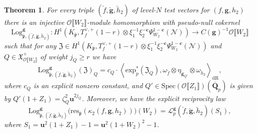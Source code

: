 \documentclass[10pt,letterpaper]{amsart}
\theoremstyle{plain}
\newtheorem{thm}{Theorem}[subsection] %
\theoremstyle{definition}
\theoremstyle{definition}
\theoremstyle{plain}
\theoremstyle{plain}
\theoremstyle{plain}
\theoremstyle{remark}
\numberwithin{equation}{section}
\newcommand{\cc}{\mathbf{c}}
\newcommand{\ch}{\xi}
\newcommand{\rH}{H}
\newcommand{\ppbar}{\bar{\mathfrak{p}}}
\def\cO{\mathcal O}
\newcommand{\Q}{\mathbf{Q}}
\newcommand{\dBr}[1]{\llbracket{#1}\rrbracket}
\newcommand{\bfg}{{\boldsymbol{g}}}
\begin{document}
\begin{thm}\label{thm:ERL-indef}
For every triple $(\breve{f},\breve{\bfg},\breve{h}_2)$ of level-$N$ test vectors for $(f,\bfg,h_2)$ there is an injective $\cO\dBr{W_2}$-module homomorphism with pseudo-null cokernel
\[
{\mathrm{Log}}^{\bfg}_{\ppbar,(\breve{f},\breve{\bfg},\breve{h}_2)}:\rH^1(K_{\ppbar},T_f^{\vee,+}(1-r)\otimes\ch_1^{-1}\ch_2^{-\cc}\Psi_{W_2}^{1-\cc}(\mathscr{N}))\rightarrow C(\bfg)^{-1}\cO\dBr{W_2}
\]
such that for any $\mathfrak{Z}\in\rH^1(K_{\ppbar},T_f^{\vee,+}(1-r)\otimes\ch_1^{-1}\ch_2^{-\cc}\Psi_{W_2}^{1-\cc}(\mathscr{N}))$ and $Q\in\mathfrak{X}_{\cO\dBr{W_2}}^+$ of weight $j_Q\geq r$ we have
\[
{\mathrm{Log}}^\bfg_{\ppbar,(\breve{f},\breve{\bfg},\breve{h}_2)}(\mathfrak{Z})_Q=
c_Q\cdot\left\langle{\mathrm{exp}}^*_p(\mathfrak{Z}_{Q}),\omega_{\breve{f}}\otimes\eta_{\breve{\bfg}_{Q'}}\otimes\omega_{\breve{h}_2}\right\rangle_{\mathrm{dR}},
\]
where $c_Q$ is an explicit nonzero constant, and $Q'\in{\mathrm{Spec}}(\cO\dBr{Z_1})(\overline{\Q}_p)$ is given by $Q'(1+Z_1)=\zeta_Q^2\mathbf{u}^{2j_Q}$. Moreover, we have 
the \emph{explicit reciprocity law}
\[
{\mathrm{Log}}^\bfg_{\ppbar,(\breve{f},\breve{\bfg},\breve{h}_2)}\bigl({\mathrm{res}}_{\ppbar}(\kappa_2(f,\bfg,h_2))\bigr)(W_2)=\mathscr{L}_p^{\bfg}(\breve{f},\breve{\bfg},\breve{h}_2)(S_1),
\]
where $S_1=\mathbf{u}^2(1+Z_1)-1=\mathbf{u}^2(1+W_2)^2-1$.
\end{thm}
\end{document}
